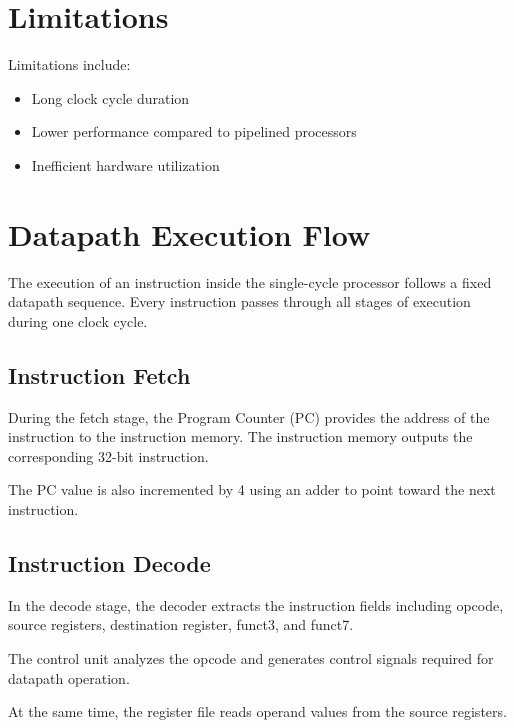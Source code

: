 \documentclass[conference]{IEEEtran}
\begin{document}

\section{Limitations}

Limitations include:

\begin{itemize}
    \item Long clock cycle duration
    \item Lower performance compared to pipelined processors
    \item Inefficient hardware utilization
\end{itemize}


\section{Datapath Execution Flow}

The execution of an instruction inside the single-cycle processor follows a fixed datapath sequence. Every instruction passes through all stages of execution during one clock cycle.

\subsection{Instruction Fetch}

During the fetch stage, the Program Counter (PC) provides the address of the instruction to the instruction memory. The instruction memory outputs the corresponding 32-bit instruction.

The PC value is also incremented by 4 using an adder to point toward the next instruction.

\subsection{Instruction Decode}

In the decode stage, the decoder extracts the instruction fields including opcode, source registers, destination register, funct3, and funct7.

The control unit analyzes the opcode and generates control signals required for datapath operation.

At the same time, the register file reads operand values from the source registers.
\end{document}
